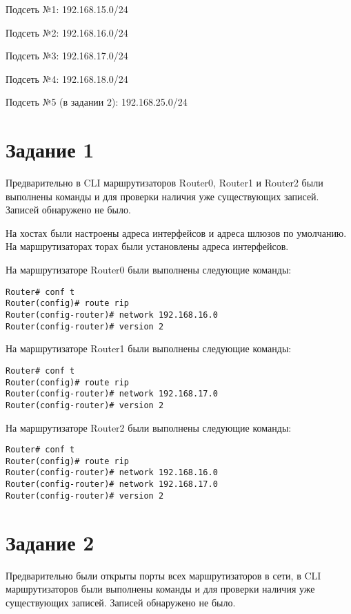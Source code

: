 Подсеть №1: 192.168.15.0/24

Подсеть №2: 192.168.16.0/24

Подсеть №3: 192.168.17.0/24

Подсеть №4: 192.168.18.0/24

Подсеть №5 (в задании 2): 192.168.25.0/24

\section*{Задание 1}

Предварительно в CLI маршрутизаторов Router0, Router1 и Router2 были выполнены команды  и   для проверки наличия уже существующих записей. Записей обнаружено не было.

На хостах были настроены адреса интерфейсов и адреса шлюзов по умолчанию. На маршрутизаторах торах были установлены адреса интерфейсов.

На маршрутизаторе Router0 были выполнены следующие команды:
\begin{lstlisting}[numbers=none]
Router# conf t
Router(config)# route rip
Router(config-router)# network 192.168.16.0
Router(config-router)# version 2
\end{lstlisting}

На маршрутизаторе Router1 были выполнены следующие команды:
\begin{lstlisting}[numbers=none]
Router# conf t
Router(config)# route rip
Router(config-router)# network 192.168.17.0
Router(config-router)# version 2
\end{lstlisting}

На маршрутизаторе Router2 были выполнены следующие команды:
\begin{lstlisting}[numbers=none]
Router# conf t
Router(config)# route rip
Router(config-router)# network 192.168.16.0
Router(config-router)# network 192.168.17.0
Router(config-router)# version 2
\end{lstlisting}

\section*{Задание 2}

Предварительно были открыты порты всех маршрутизаторов в сети, в CLI маршрутизаторов были выполнены команды  и   для проверки наличия уже существующих записей. Записей обнаружено не было.

